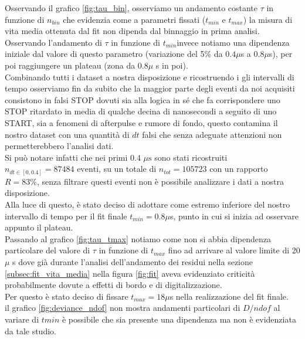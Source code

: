 \documentclass[10pt,a4paper]{article}
\begin{document}
\begin{flushleft}
Osservando il grafico \ref{fig:tau_bin}, osserviamo un andamento costante $\tau$ in funzione di $n_{bin}$ che evidenzia come a parametri fissati ($t_{min}$ e $t_{max}$) la misura di vita media ottenuta dal fit non dipenda dal binnaggio in prima analisi.\\
Osservando l'andamento di $\tau$ in funzione di $t_{min}$invece notiamo una dipendenza iniziale dal valore di questo parametro (variazione del 5\% da $0.4\mu$s a $0.8\mu$s), per poi raggiungere un plateau (zona da 0.8$\mu$ s in poi).\\
Combinando tutti i dataset a nostra disposizione e ricostruendo i gli intervalli di tempo osserviamo fin da subito che la maggior parte degli eventi da noi acquisiti consistono in falsi STOP dovuti sia alla logica in sé che fa corrispondere uno STOP ritardato in media di qualche decina di nanosecondi a seguito di uno START, sia a fenomeni di afterpulse e rumore di fondo, questo contamina il nostro dataset con una quantità di $dt$ falsi che senza adeguate attenzioni non permetterebbero l'analisi dati.\\
Si può notare infatti che nei primi 0.4 $\mu \text{s}$ sono stati ricostruiti $n_{dt\in[0,0.4]}= 87484 \text{ eventi} $, su un totale di $n_{tot}= 105723$ con un rapporto $R=83\%$, senza filtrare questi eventi non è possibile analizzare i dati a nostra disposizione.\\ 
Alla luce di questo, è stato deciso di adottare come estremo inferiore del nostro intervallo di tempo per il fit finale $t_{min}=0.8\mu$s, punto in cui si inizia ad osservare appunto il plateau.\\
Passando al grafico \ref{fig:tau_tmax} notiamo come non si abbia dipendenza particolare del valore di $\tau$ in funzione di $t_{max}$ fino ad arrivare al valore limite di 20$\mu$ s dove già durante l'analisi dell'andamento dei residui nella sezione \ref{subsec:fit_vita_media} nella figura \ref{fig:fit} aveva evidenziato criticità probabilmente dovute a effetti di bordo e di digitalizzazione.\\
Per questo è stato deciso di fissare $t_{max}=18 \mu $s nella realizzazione del fit finale.\\
il grafico \ref{fig:deviance_ndof} non mostra andamenti particolari di $D/ndof$ al variare di $t{min}$ è possibile che sia presente una dipendenza ma non è evidenziata da tale studio.\\
\end{flushleft}
\end{document}
